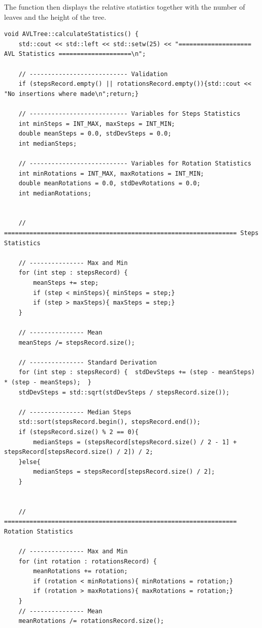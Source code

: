 \documentclass[12pt, a4paper]{report}
\begin{document}
The function then displays the relative statistics together with the number of leaves and the height of the tree.
\begin{verbatim}
void AVLTree::calculateStatistics() {
    std::cout << std::left << std::setw(25) << "==================== AVL Statistics ====================\n";

    // --------------------------- Validation
    if (stepsRecord.empty() || rotationsRecord.empty()){std::cout << "No insertions where made\n";return;}

    // --------------------------- Variables for Steps Statistics
    int minSteps = INT_MAX, maxSteps = INT_MIN;
    double meanSteps = 0.0, stdDevSteps = 0.0;
    int medianSteps;

    // --------------------------- Variables for Rotation Statistics
    int minRotations = INT_MAX, maxRotations = INT_MIN;
    double meanRotations = 0.0, stdDevRotations = 0.0;
    int medianRotations;


    // ================================================================ Steps Statistics

    // --------------- Max and Min
    for (int step : stepsRecord) {
        meanSteps += step;
        if (step < minSteps){ minSteps = step;}
        if (step > maxSteps){ maxSteps = step;}
    }

    // --------------- Mean
    meanSteps /= stepsRecord.size();

    // --------------- Standard Derivation
    for (int step : stepsRecord) {  stdDevSteps += (step - meanSteps) * (step - meanSteps);  }
    stdDevSteps = std::sqrt(stdDevSteps / stepsRecord.size());

    // --------------- Median Steps    
    std::sort(stepsRecord.begin(), stepsRecord.end());
    if (stepsRecord.size() % 2 == 0){
        medianSteps = (stepsRecord[stepsRecord.size() / 2 - 1] + stepsRecord[stepsRecord.size() / 2]) / 2;
    }else{
        medianSteps = stepsRecord[stepsRecord.size() / 2];
    }


    // ================================================================ Rotation Statistics

    // --------------- Max and Min
    for (int rotation : rotationsRecord) {
        meanRotations += rotation;
        if (rotation < minRotations){ minRotations = rotation;}
        if (rotation > maxRotations){ maxRotations = rotation;}
    }
    // --------------- Mean
    meanRotations /= rotationsRecord.size();


\end{verbatim}
\end{document}
